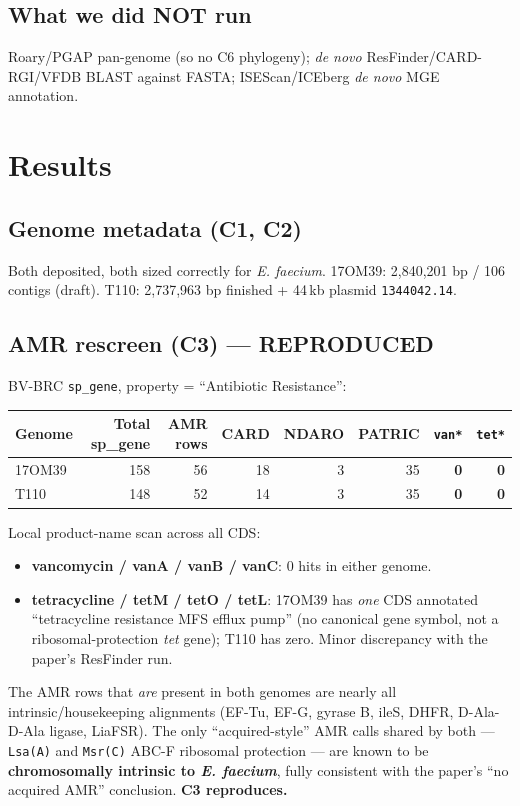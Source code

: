 \documentclass[11pt,a4paper]{article}
\begin{document}
\subsection{What we did NOT run}
Roary/PGAP pan-genome (so no C6 phylogeny); \emph{de novo} ResFinder/CARD-RGI/VFDB BLAST against FASTA; ISEScan/ICEberg \emph{de novo} MGE annotation.

\section{Results}
\subsection{Genome metadata (C1, C2)}
Both deposited, both sized correctly for \emph{E. faecium}. 17OM39: 2{,}840{,}201 bp / 106 contigs (draft). T110: 2{,}737{,}963 bp finished + 44\,kb plasmid \texttt{1344042.14}. \checkmark

\subsection{AMR rescreen (C3) --- REPRODUCED}
BV-BRC \texttt{sp\_gene}, property = ``Antibiotic Resistance'':

\begin{longtable}{lrrrrrrr}
\toprule
Genome & Total sp\_gene & AMR rows & CARD & NDARO & PATRIC & \texttt{van*} & \texttt{tet*} \\
\midrule
17OM39 & 158 & 56 & 18 & 3 & 35 & \textbf{0} & \textbf{0} \\
T110   & 148 & 52 & 14 & 3 & 35 & \textbf{0} & \textbf{0} \\
\bottomrule
\end{longtable}

Local product-name scan across all CDS:
\begin{itemize}[nosep]
\item \textbf{vancomycin / vanA / vanB / vanC}: 0 hits in either genome. \checkmark
\item \textbf{tetracycline / tetM / tetO / tetL}: 17OM39 has \emph{one} CDS annotated ``tetracycline resistance MFS efflux pump'' (no canonical gene symbol, not a ribosomal-protection \emph{tet} gene); T110 has zero. Minor discrepancy with the paper's ResFinder run.
\end{itemize}

The AMR rows that \emph{are} present in both genomes are nearly all intrinsic/housekeeping alignments (EF-Tu, EF-G, gyrase B, ileS, DHFR, D-Ala-D-Ala ligase, LiaFSR). The only ``acquired-style'' AMR calls shared by both --- \texttt{Lsa(A)} and \texttt{Msr(C)} ABC-F ribosomal protection --- are known to be \textbf{chromosomally intrinsic to \emph{E. faecium}}, fully consistent with the paper's ``no acquired AMR'' conclusion. \textbf{C3 reproduces.}
\end{document}
